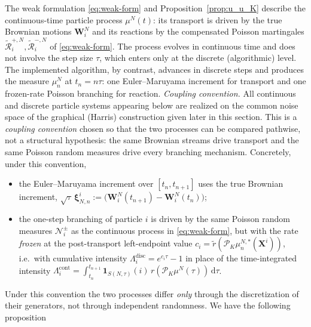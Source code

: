 \documentclass[a4paper,fleqn]{cas-sc}
\theoremstyle{definition}
\theoremstyle{remark}
\begin{document}
The weak formulation \eqref{eq:weak-form} and Proposition~\ref{prop:u_u_K} describe the continuous-time particle process $\mu^N(t)$: its transport is driven by the true Brownian motions $\mathbf W^N_i$ and its reactions by the compensated Poisson martingales $\widetilde{\mathcal R}^{+,N}_i,\widetilde{\mathcal R}^{-,N}_i$ of \eqref{eq:weak-form}. 
The process evolves in continuous time and does not involve the step size $\tau$, which enters only at the discrete (algorithmic) level.  The implemented algorithm, by contrast, advances in discrete steps and produces the measure $\mu^N_n$ at $t_n=n\tau$: one Euler--Maruyama increment for transport and one frozen-rate Poisson branching for reaction. 
\emph{Coupling convention.} All continuous and discrete particle systems
appearing below are realized on the common noise space of the graphical (Harris)
construction given later in this section. This is a \emph{coupling convention}
chosen so that the two processes can be compared pathwise, not a structural
hypothesis: the same Brownian streams drive transport and the same Poisson random
measures drive every branching mechanism. Concretely, under this convention,
\begin{itemize}
\item[(C1)] the Euler--Maruyama increment over $[t_n,t_{n+1}]$ uses the true
Brownian increment, $\sqrt{\tau}\,\boldsymbol\xi^i_{N,n}
:=\big(\mathbf W^N_i(t_{n+1})-\mathbf W^N_i(t_n)\big)$;
\item[(C2)] the one-step branching of particle $i$ is driven by the same Poisson
random measures $\mathcal N^\pm_i$ as the continuous process in
\eqref{eq:weak-form}, but with the rate \emph{frozen} at the post-transport
left-endpoint value $c_i=\tilde r(\mathcal P_K\mu^{N,*}_n(\mathbf X^i))$, i.e.\ with
cumulative intensity $\Lambda^{\mathrm{disc}}_i=e^{c_i\tau}-1$ in place of the
time-integrated intensity
$\Lambda^{\mathrm{cont}}_i=\int_{t_n}^{t_{n+1}}\mathbf 1_{S(N,\tau)}(i)\,
r(\mathcal P_K\mu^N(\tau))\,\mathrm d\tau$.
\end{itemize}
Under this convention the two processes differ \emph{only} through the
discretization of their generators, not through independent randomness. We have the following proposition
\end{document}
